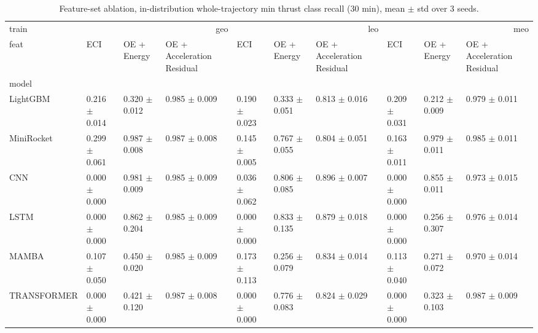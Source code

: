 \begin{table}
\caption{Feature-set ablation, in-distribution whole-trajectory min thrust class recall (30 min), mean $\pm$ std over 3 seeds.}
\label{tab:total_feat_minrec}
\begin{tabular}{llllllllll}
\toprule
train & \multicolumn{3}{r}{geo} & \multicolumn{3}{r}{leo} & \multicolumn{3}{r}{meo} \\
feat & ECI & OE + Energy & OE + Acceleration Residual & ECI & OE + Energy & OE + Acceleration Residual & ECI & OE + Energy & OE + Acceleration Residual \\
model &  &  &  &  &  &  &  &  &  \\
\midrule
LightGBM & 0.216 $\pm$ 0.014 & 0.320 $\pm$ 0.012 & 0.985 $\pm$ 0.009 & 0.190 $\pm$ 0.023 & 0.333 $\pm$ 0.051 & 0.813 $\pm$ 0.016 & 0.209 $\pm$ 0.031 & 0.212 $\pm$ 0.009 & 0.979 $\pm$ 0.011 \\
MiniRocket & 0.299 $\pm$ 0.061 & 0.987 $\pm$ 0.008 & 0.987 $\pm$ 0.008 & 0.145 $\pm$ 0.005 & 0.767 $\pm$ 0.055 & 0.804 $\pm$ 0.051 & 0.163 $\pm$ 0.011 & 0.979 $\pm$ 0.011 & 0.985 $\pm$ 0.011 \\
CNN & 0.000 $\pm$ 0.000 & 0.981 $\pm$ 0.009 & 0.985 $\pm$ 0.009 & 0.036 $\pm$ 0.062 & 0.806 $\pm$ 0.085 & 0.896 $\pm$ 0.007 & 0.000 $\pm$ 0.000 & 0.855 $\pm$ 0.011 & 0.973 $\pm$ 0.015 \\
LSTM & 0.000 $\pm$ 0.000 & 0.862 $\pm$ 0.204 & 0.985 $\pm$ 0.009 & 0.000 $\pm$ 0.000 & 0.833 $\pm$ 0.135 & 0.879 $\pm$ 0.018 & 0.000 $\pm$ 0.000 & 0.256 $\pm$ 0.307 & 0.976 $\pm$ 0.014 \\
MAMBA & 0.107 $\pm$ 0.050 & 0.450 $\pm$ 0.020 & 0.985 $\pm$ 0.009 & 0.173 $\pm$ 0.113 & 0.256 $\pm$ 0.079 & 0.834 $\pm$ 0.014 & 0.113 $\pm$ 0.040 & 0.271 $\pm$ 0.072 & 0.970 $\pm$ 0.014 \\
TRANSFORMER & 0.000 $\pm$ 0.000 & 0.421 $\pm$ 0.120 & 0.987 $\pm$ 0.008 & 0.000 $\pm$ 0.000 & 0.776 $\pm$ 0.083 & 0.824 $\pm$ 0.029 & 0.000 $\pm$ 0.000 & 0.323 $\pm$ 0.103 & 0.987 $\pm$ 0.009 \\
\bottomrule
\end{tabular}
\end{table}

